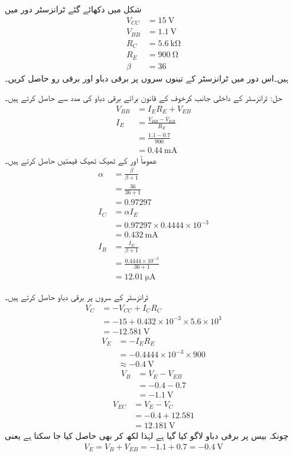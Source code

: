 شکل    میں دکھائے گئے ٹرانزسٹر دور میں
\begin{align*}
V_{CC} &=\SI{15}{\volt}\\
V_{BB} &=\SI{1.1}{\volt}\\
R_C&=\SI{5.6}{\kilo \ohm} \\
R_E &=\SI{900}{\ohm} \\
\beta &=36
\end{align*}
 ہیں۔اس دور میں ٹرانزسٹر کے تینوں سروں پر برقی دباو اور برقی رو حاصل کریں۔

حل:
ٹرانزسٹر کے داخلی جانب کرخوف کے قانون برائے برقی دباو کی مدد سے  حاصل کرتے ہیں۔
\begin{align*}
V_{BB} &=I_{E}R_{E}+V_{EB}\\
I_E&=\frac{V_{BB}-V_{EB}}{R_E}\\
&=\frac{1.1-0.7}{900}\\
&=\SI{0.44}{\milli \ampere}
\end{align*}
عموماً اور    کے ٹھیک ٹھیک قیمتیں حاصل کرتے ہیں۔
\begin{align*}
\alpha&=\frac{\beta}{\beta+1}\\
&=\frac{36}{36+1}\\
&=\num{0.97297}
\\
I_C&=\alpha I_E\\
&=0.97297 \times  0.4444  \times 10^{-3}\\
&=\SI{0.432}{\milli \ampere}\\
I_B&=\frac{I_E}{\beta+1}\\
&=\frac{0.4444 \times 10^{-3}}{36+1}\\
&=\SI{12.01}{\micro \ampere}
\end{align*}

ٹرانزسٹر کے سروں پر برقی دباو حاصل کرتے ہیں۔
\begin{align*}
V_C&=-V_{CC}+I_{C}R_{C}\\
&=-15+0.432 \times 10^{-3} \times 5.6 \times 10^{3}\\
&=\SI{-12.581}{\volt}
\end{align*}
%
\begin{align*}
V_E&=-I_{E}R_{E}\\
&=-0.4444 \times 10^{-3} \times 900\\
&\approx \SI{-0.4}{\volt}
\end{align*}
%
\begin{align*}
V_B&=V_E-V_{EB}\\
&=-0.4-0.7\\
&=\SI{-1.1}{\volt}
\end{align*}
%
\begin{align*}
V_{EC}&=V_E-V_C\\
&=-0.4+12.581\\
&=\SI{12.181}{\volt}
\end{align*}
چونکہ بیس پر برقی دباو  لاگو کیا گیا ہے لہٰذا  لکھ کر بھی حاصل کیا جا سکتا ہے یعنی
\begin{align*}
V_E=V_B+V_{EB}=-1.1+0.7=\SI{-0.4}{\volt}
\end{align*}

